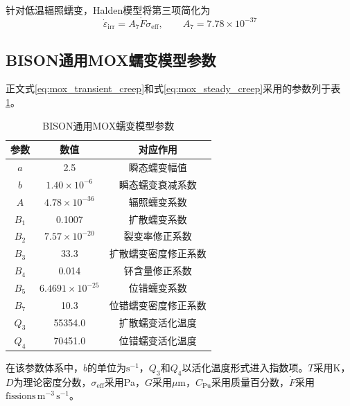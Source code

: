 针对低温辐照蠕变，Halden模型将第三项简化为\cite{hwr-1039}
\begin{equation}
	\dot{\varepsilon}_{\mathrm{irr}}
	=A_7\dot{F}\sigma_{\mathrm{eff}},
	\qquad A_7=7.78\times10^{-37}
	\label{eq:appendix_halden_irradiation_creep}
\end{equation}

\subsection{BISON通用MOX蠕变模型参数}

正文式\eqref{eq:mox_transient_creep}和式\eqref{eq:mox_steady_creep}采用的参数列于表\ref{tab:appendix_bison_mox_creep_parameters}。

\begin{table}[htbp]
	\centering
	\caption{BISON通用MOX蠕变模型参数}
	\label{tab:appendix_bison_mox_creep_parameters}
	\begin{tabular*}{0.88\textwidth}{
			@{\extracolsep{\fill}}
			ccc
			@{}
		}
		\toprule
		参数 & 数值 & 对应作用 \\
		\midrule
		$a$   & 2.5                      & 瞬态蠕变幅值 \\
		$b$   & $1.40\times10^{-6}$      & 瞬态蠕变衰减系数 \\
		$A$   & $4.78\times10^{-36}$     & 辐照蠕变系数 \\
		$B_1$ & 0.1007                   & 扩散蠕变系数 \\
		$B_2$ & $7.57\times10^{-20}$     & 裂变率修正系数 \\
		$B_3$ & 33.3                     & 扩散蠕变密度修正系数 \\
		$B_4$ & 0.014                    & 钚含量修正系数 \\
		$B_5$ & $6.4691\times10^{-25}$   & 位错蠕变系数 \\
		$B_7$ & 10.3                     & 位错蠕变密度修正系数 \\
		$Q_3$ & 55354.0                  & 扩散蠕变活化温度 \\
		$Q_4$ & 70451.0                  & 位错蠕变活化温度 \\
		\bottomrule
	\end{tabular*}
\end{table}

在该参数体系中，$b$的单位为$\mathrm{s^{-1}}$，$Q_3$和$Q_4$以活化温度形式进入指数项。$T$采用K，$D$为理论密度分数，$\sigma_{\mathrm{eff}}$采用Pa，$G$采用$\mu\mathrm{m}$，$C_{\mathrm{Pu}}$采用质量百分数，$\dot{F}$采用$\mathrm{fissions\,m^{-3}\,s^{-1}}$。

